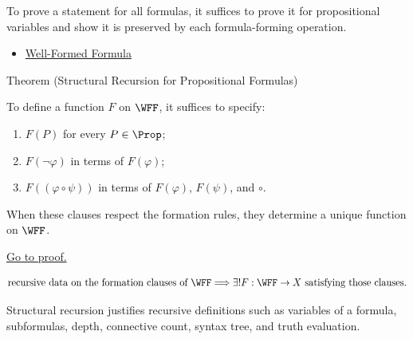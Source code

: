 \begin{remark*}[Interpretation]
To prove a statement for all formulas, it suffices to prove it for propositional variables and show it is preserved by each formula-forming operation.
\end{remark*}

\begin{dependencies}
\begin{itemize}
  \item \hyperref[def:well-formed-formula]{Well-Formed Formula}
\end{itemize}
\end{dependencies}
\begin{theorembox}{Theorem (Structural Recursion for Propositional Formulas)}
\begin{theorem}
\label{thm:structural-recursion-propositional-formulas}
To define a function \(F\) on \(\WFF\), it suffices to specify:
\begin{enumerate}
\item \(F(P)\) for every \(P\in\Prop\);
\item \(F(\neg\varphi)\) in terms of \(F(\varphi)\);
\item \(F((\varphi\circ\psi))\) in terms of \(F(\varphi)\), \(F(\psi)\), and \(\circ\).
\end{enumerate}
When these clauses respect the formation rules, they determine a unique function on \(\WFF\).

\noindent\hyperref[prf:structural-recursion-propositional-formulas]{Go to proof.}
\end{theorem}
\end{theorembox}

\begin{remark*}
\[
\text{recursive data on the formation clauses of }\WFF
\Longrightarrow
\exists!F:\WFF\to X
\text{ satisfying those clauses}.
\]
\end{remark*}

\begin{remark*}[Interpretation]
Structural recursion justifies recursive definitions such as variables of a formula, subformulas, depth, connective count, syntax tree, and truth evaluation.
\end{remark*}

